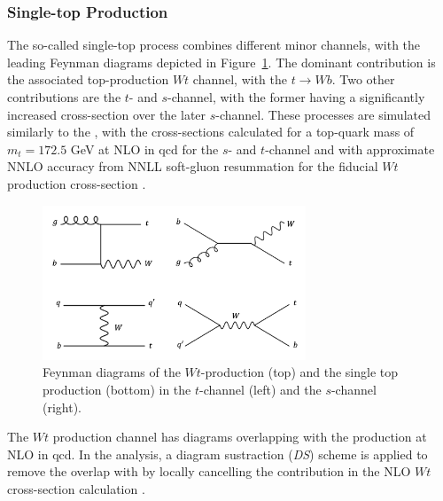 \subsubsection{Single-top Production}
The so-called single-top process combines different minor channels, with the leading Feynman diagrams depicted in Figure~\ref{fig:feynstop}. The dominant contribution is the associated top-production $Wt$ channel, with the $t \rightarrow Wb$. Two other contributions are the $t$- and $s$-channel, with the former having a significantly increased cross-section over the later $s$-channel. These processes are simulated similarly to the \ttb, with the cross-sections calculated for a top-quark mass of $m_t = 172.5$ GeV at NLO in \gls{qcd} for the $s$- and $t$-channel \cite{ALIEV20111034, KANT201574} and with approximate NNLO accuracy from NNLL soft-gluon resummation for the fiducial $Wt$ production cross-section \cite{PhysRevD.82.054018, kidonakis2013quark}.
\begin{figure}[h!]
  \center
  \includegraphics[width=0.7\textwidth]{Images/VH/Feynman/singletop.png}
  \caption{Feynman diagrams of the $Wt$-production (top) and the single top production (bottom) in the $t$-channel (left) and the $s$-channel (right).} 
  \label{fig:feynstop}
\end{figure}

The $Wt$ production channel has diagrams overlapping with the \ttb production at NLO in \gls{qcd}. In the analysis, a diagram sustraction (\textit{DS}) scheme is applied to remove the overlap with \ttb by locally cancelling the \ttb contribution in the NLO $Wt$ cross-section calculation \cite{StefanoFrixione_2008}. 

